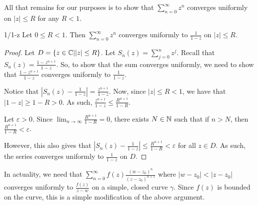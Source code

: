 All that remains for our purposes is to show that $\sum_{n = 0}^\infty z^n$ converges uniformly on $|z| \le R$ for any $R < 1$.

\begin{thmbo}{}{1/1-z} Let $0 \le R < 1$. Then $\sum_{n = 0}^\infty z^n$ converges uniformly to $\frac{1}{1-z}$ on $|z| \le R$.\end{thmbo}

\begin{proof} Let $D = \{z\in\mathbb{C}||z| \le R\}$. Let $S_n(z) = \sum_{j = 0}^n z^j$. Recall that $S_n(z) = \frac{1 - z^{n+1}}{1-z}$. So, to show that the sum converges uniformly, we need to show that $\frac{1- z^{n+1}}{1-z}$ converges uniformly to $\frac{1}{1-z}$.

Notice that $|S_n(z) - \frac{1}{1-z}| = \frac{z^{n+1}}{1-z}$. Now, since $|z| \le R < 1$, we have that $|1 - z| \ge 1 - R > 0$. As such, $\frac{z^{n+1}}{1-z} \le \frac{R^{n+1}}{1 - R}$.

Let $\varepsilon > 0$. Since $\lim_{n\rightarrow \infty} \frac{R^{n+1}}{1-R} = 0$, there exists $N\in \mathbb{N}$ such that if $n > N$, then $\frac{R^{n+1}}{1-R} < \varepsilon$.

However, this also gives that $|S_n(z) - \frac{1}{1-z}| \le \frac{R^{n+1}}{1-R} < \varepsilon$ for all $z\in D$. As such, the series converges uniformly to $\frac{1}{1-z}$ on $D$.
\end{proof}

In actuality, we need that $\sum_{n = 0}^\infty f(z) \frac{(w-z_0)^n}{(z-z_0)^{n+1}}$ where $|w-z_0| < |z-z_0|$ converges uniformly to $\frac{f(z)}{z-w}$ on a simple, closed curve $\gamma$. Since $f(z)$ is bounded on the curve, this is a simple modification of the above argument.